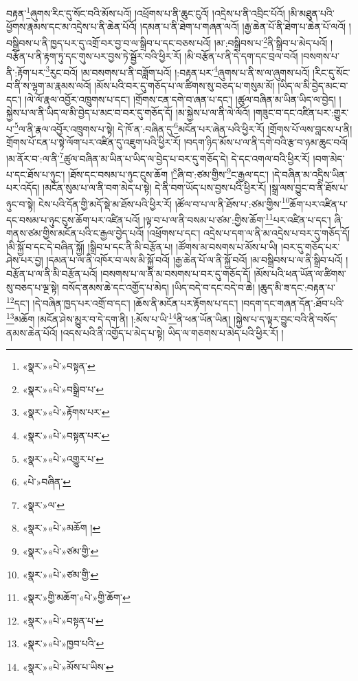 བརྟན་\footnote{«སྣར་»«པེ་»བསྟན་}ཞུགས་རིང་དུ་སོང་བའི་མོས་པའོ། །འཕྲོགས་པ་ནི་ཆུང་ངུའོ། །འདྲེས་པ་ནི་འབྲིང་པོའོ། །མི་མཐུན་པའི་ཕྱོགས་རྣམས་དང་མ་འདྲེས་པ་ནི་ཆེན་པོའོ། །དམན་པ་ནི་ཐེག་པ་གཞན་ལའོ། །རྒྱ་ཆེན་པོ་ནི་ཐེག་པ་ཆེན་པོ་ལའོ། །བསྒྲིབས་པ་ནི་ཁྱད་པར་དུ་འགྲོ་བར་བྱ་བ་ལ་སྒྲིབ་པ་དང་བཅས་པའོ། །མ་:བསྒྲིབས་པ་\footnote{«སྣར་»«པེ་»བསྒྲིབ་པ་}ནི་སྒྲིབ་པ་མེད་པའོ། །བརྩོན་པ་ནི་རྟག་ཏུ་དང་གུས་པར་བྱས་ཏེ་སྦྱོར་བའི་ཕྱིར་རོ། །མི་བརྩོན་པ་ནི་དེ་དག་དང་བྲལ་བའོ། །བསགས་པ་ནི་:རྟོག་པར་\footnote{«སྣར་»«པེ་»རྟོགས་པར་}རུང་བའོ། །མ་བསགས་པ་ནི་བཟློག་པའོ། །:བརྟན་པར་\footnote{«སྣར་»«པེ་»བསྟན་པར་}ཞུགས་པ་ནི་ས་ལ་ཞུགས་པའོ། །རིང་དུ་སོང་བ་ནི་ས་ལྷག་མ་རྣམས་ལའོ། །མོས་པའི་བར་དུ་གཅོད་པ་ལ་ཚིགས་སུ་བཅད་པ་གསུམ་མོ། །ཡིད་ལ་མི་བྱེད་མང་བ་དང་། །ལེ་ལོ་རྣལ་འབྱོར་འཁྲུགས་པ་དང་། །གྲོགས་ངན་དགེ་བ་ཞན་པ་དང་། །ཚུལ་བཞིན་མ་ཡིན་ཡིད་ལ་བྱེད། །སྐྱེས་པ་ལ་ནི་ཡིད་ལ་མི་བྱེད་པ་མང་བ་བར་དུ་གཅོད་དོ། །མ་སྐྱེས་པ་ལ་ནི་ལེ་ལོའོ། །གཟུང་བ་དང་འཛིན་པར་:གྱུར་པ་\footnote{«སྣར་»«པེ་»འགྱུར་པ་}ལ་ནི་རྣལ་འབྱོར་འཁྲུགས་པ་སྟེ། དེ་ཁོ་ན་:བཞིན་དུ་\footnote{«པེ་»བཞིན་}མངོན་པར་ཞེན་པའི་ཕྱིར་རོ། །གྲོགས་པོ་ལས་བླངས་པ་ནི། གྲོགས་པོ་ངན་པ་སྟེ་ལོག་པར་འཛིན་དུ་འཇུག་པའི་ཕྱིར་རོ། །བདག་ཉིད་མོས་པ་ལ་ནི་དགེ་བའི་རྩ་བ་ཉམ་ཆུང་བའོ། །མ་ནོར་བ་:ལ་ནི་\footnote{«སྣར་»ལ་}ཚུལ་བཞིན་མ་ཡིན་པ་ཡིད་ལ་བྱེད་པ་བར་དུ་གཅོད་དེ། དེ་དང་འགལ་བའི་ཕྱིར་རོ། །བག་མེད་པ་དང་ཐོས་པ་ཉུང་། །ཐོས་དང་བསམ་པ་ཉུང་ངུས་ཆོག །\footnote{«སྣར་»«པེ་»མཆོག །}ཞི་བ་:ཙམ་གྱིས་\footnote{«སྣར་»«པེ་»ཙམ་གྱི་}ང་རྒྱལ་དང་། །དེ་བཞིན་མ་འདྲིས་ཡིན་པར་འདོད། །མངོན་སུམ་པ་ལ་ནི་བག་མེད་པ་སྟེ། དེ་ནི་བག་ཡོད་པས་བྱས་པའི་ཕྱིར་རོ། །སྒྲ་ལས་བྱུང་བ་ནི་ཐོས་པ་ཉུང་བ་སྟེ། ངེས་པའི་དོན་གྱི་མདོ་སྡེ་མ་ཐོས་པའི་ཕྱིར་རོ། །ཚོལ་བ་པ་ལ་ནི་ཐོས་པ་:ཙམ་གྱིས་\footnote{«སྣར་»«པེ་»ཙམ་གྱི་}ཆོག་པར་འཛིན་པ་དང་བསམ་པ་ཉུང་ངུས་ཆོག་པར་འཛིན་པའོ། །ལྟ་བ་པ་ལ་ནི་བསམ་པ་ཙམ་:གྱིས་ཆོག་\footnote{«སྣར་»གྱི་མཆོག་«པེ་»གྱི་ཆོག་}པར་འཛིན་པ་དང་། ཞི་གནས་ཙམ་གྱིས་མངོན་པའི་ང་རྒྱལ་བྱེད་པའོ། །འཕྲོགས་པ་དང་། འདྲེས་པ་དག་ལ་ནི་མ་འདྲེས་པ་བར་དུ་གཅོད་དོ། །མི་སྐྱོ་བ་དང་དེ་བཞིན་སྐྱོ། །སྒྲིབ་པ་དང་ནི་མི་བརྩོན་པ། །ཚོགས་མ་བསགས་པ་མོས་པ་ཡི། །བར་དུ་གཅོད་པར་ཤེས་པར་བྱ། །དམན་པ་ལ་ནི་འཁོར་བ་ལས་མི་སྐྱོ་བའོ། །རྒྱ་ཆེན་པོ་ལ་ནི་སྐྱོ་བའོ། །མ་བསྒྲིབས་པ་ལ་ནི་སྒྲིབ་པའོ། །བརྩོན་པ་ལ་ནི་མི་བརྩོན་པའོ། །བསགས་པ་ལ་ནི་མ་བསགས་པ་བར་དུ་གཅོད་དོ། །མོས་པའི་ཕན་ཡོན་ལ་ཚིགས་སུ་བཅད་པ་ལྔ་སྟེ། བསོད་ནམས་ཆེ་དང་འགྱོད་པ་མེད། །ཡིད་བདེ་བ་དང་བདེ་བ་ཆེ། །ཆུད་མི་ཟ་དང་:བརྟན་པ་\footnote{«སྣར་»«པེ་»བསྟན་པ་}དང་། །དེ་བཞིན་ཁྱད་པར་འགྲོ་བ་དང་། །ཆོས་ནི་མངོན་པར་རྟོགས་པ་དང་། །བདག་དང་གཞན་དོན་:ཐོབ་པའི་\footnote{«སྣར་»«པེ་»ཁྱབ་པའི་}མཆོག །མངོན་ཤེས་མྱུར་བ་དེ་དག་ནི། །:མོས་པ་ཡི་\footnote{«སྣར་»«པེ་»མོས་པ་ཡིས་}ནི་ཕན་ཡོན་ཡིན། །སྐྱེས་པ་ད་ལྟར་བྱུང་བའི་ནི་བསོད་ནམས་ཆེན་པོའོ། །འདས་པའི་ནི་འགྱོད་པ་མེད་པ་སྟེ། ཡིད་ལ་གཅགས་པ་མེད་པའི་ཕྱིར་རོ། །
